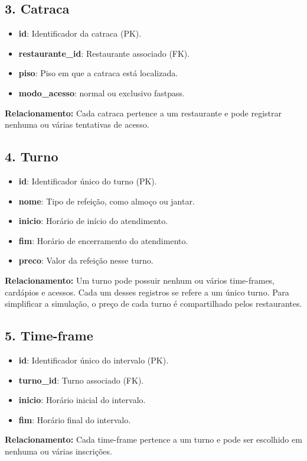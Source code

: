 \documentclass[a4paper,12pt]{article}
\begin{document}
\subsection*{3. Catraca}
\begin{itemize}
    \item \textbf{id}: Identificador da catraca (PK).
    \item \textbf{restaurante\_id}: Restaurante associado (FK).
    \item \textbf{piso}: Piso em que a catraca está localizada.
    \item \textbf{modo\_acesso}: normal ou exclusivo fastpass.
\end{itemize}
\noindent\textbf{Relacionamento:} Cada catraca pertence a um restaurante e pode 
registrar nenhuma ou várias tentativas de acesso. 

\subsection*{4. Turno}
\begin{itemize}
    \item \textbf{id}: Identificador único do turno (PK).
    \item \textbf{nome}: Tipo de refeição, como almoço ou jantar.
    \item \textbf{inicio}: Horário de início do atendimento.
    \item \textbf{fim}: Horário de encerramento do atendimento.
    \item \textbf{preco}: Valor da refeição nesse turno.
\end{itemize}
\noindent\textbf{Relacionamento:} Um turno pode possuir nenhum ou vários time-frames, cardápios e acessos. Cada um desses registros se refere a um único turno. Para simplificar a simulação, o preço de cada turno é compartilhado pelos restaurantes.
\subsection*{5. Time-frame}
\begin{itemize}
    \item \textbf{id}: Identificador único do intervalo (PK).
    \item \textbf{turno\_id}: Turno associado (FK).
    \item \textbf{inicio}: Horário inicial do intervalo.
    \item \textbf{fim}: Horário final do intervalo.
\end{itemize}
\noindent\textbf{Relacionamento:} Cada time-frame pertence a um turno e pode 
ser escolhido em nenhuma ou várias inscrições. 
\end{document}
